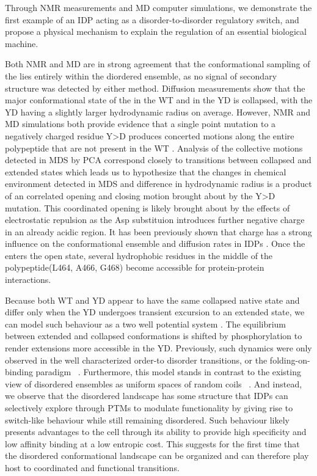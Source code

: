 Through NMR measurements and MD computer simulations, we demonstrate the first example of an IDP acting as a disorder-to-disorder regulatory switch, and propose a physical mechanism to explain the regulation of an essential biological machine. 

Both NMR and MD are in strong agreement that the conformational sampling of the \gct lies entirely within the diordered ensemble, as no signal of secondary structure was detected by either method. Diffusion measurements show that the major conformational state of the \gct in the WT and in the YD is collapsed, with the YD having a slightly larger hydrodynamic radius on average. However, NMR and MD simulations both provide evidence that a single point mutation to a negatively charged residue Y>D produces concerted motions along the entire polypeptide that are not present in the WT \gct. Analysis of the collective motions detected in MDS by PCA correspond closely to transitions between collapsed and extended states which leads us to hypothesize that the changes in chemical environment detected in MDS and difference in hydrodynamic radius is a product of an correlated opening and closing motion brought about by the Y>D mutation. This coordinated opening is likely brought about by the effects of electrostatic repulsion as the Asp substituion introduces further negative charge in an already acidic region. It has been previously shown that charge has a strong influence on the conformational ensemble and diffusion rates in IDPs \cite{mao2010net}. Once the \gct enters the open state, several hydrophobic residues in the middle of the polypeptide(L464, A466, G468) become accessible for protein-protein interactions.

 Because both WT and YD appear to have the same collapsed native state and differ only when the YD undergoes transient excursion to an extended state, we can model such behaviour as a two well potential system . The equilibrium between extended and collapsed conformations is shifted by phosphorylation to render extensions more accessible in the YD.  Previously, such dynamics were only observed in the well characterized order-to disorder transitions, or the folding-on-binding paradigm ~\cite{tompa2012intrinsically}. Furthermore, this model stands in contrast to the existing view of disordered ensembles as uniform  spaces of random coils ~\cite{mittag2007atomic}. And instead, we observe that the disordered landscape has some structure that IDPs can selectively explore  through PTMs to modulate functionality by giving rise to switch-like behaviour while still remaining disordered. Such behaviour likely presents advantages to the cell through its ability to provide high specificity and low affinity binding at a low entropic cost. This suggests for the first time that the disordered conformational landscape can be organized and can therefore play host to coordinated and functional transitions.

